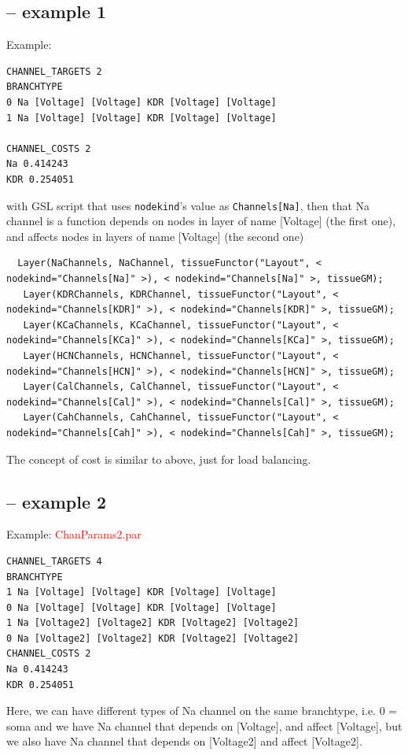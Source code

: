 \subsection{-- example 1}
Example:
\begin{verbatim}
CHANNEL_TARGETS 2
BRANCHTYPE
0 Na [Voltage] [Voltage] KDR [Voltage] [Voltage]
1 Na [Voltage] [Voltage] KDR [Voltage] [Voltage]

CHANNEL_COSTS 2
Na 0.414243
KDR 0.254051
\end{verbatim}
with GSL script that uses \verb!nodekind!'s value as \verb!Channels[Na]!, then
that Na channel is a function depends on nodes in layer of name [Voltage] (the
first one), and affects nodes in layers of name [Voltage] (the second one)
\begin{verbatim}
  Layer(NaChannels, NaChannel, tissueFunctor("Layout", < nodekind="Channels[Na]" >), < nodekind="Channels[Na]" >, tissueGM);
   Layer(KDRChannels, KDRChannel, tissueFunctor("Layout", < nodekind="Channels[KDR]" >), < nodekind="Channels[KDR]" >, tissueGM);
   Layer(KCaChannels, KCaChannel, tissueFunctor("Layout", < nodekind="Channels[KCa]" >), < nodekind="Channels[KCa]" >, tissueGM);
   Layer(HCNChannels, HCNChannel, tissueFunctor("Layout", < nodekind="Channels[HCN]" >), < nodekind="Channels[HCN]" >, tissueGM);
   Layer(CalChannels, CalChannel, tissueFunctor("Layout", < nodekind="Channels[Cal]" >), < nodekind="Channels[Cal]" >, tissueGM);
   Layer(CahChannels, CahChannel, tissueFunctor("Layout", < nodekind="Channels[Cah]" >), < nodekind="Channels[Cah]" >, tissueGM);
\end{verbatim}

The concept of cost is similar to above, just for load balancing.

\subsection{-- example 2}

Example: \textcolor{red}{ChanParams2.par}
\begin{verbatim}
CHANNEL_TARGETS 4
BRANCHTYPE
1 Na [Voltage] [Voltage] KDR [Voltage] [Voltage]
0 Na [Voltage] [Voltage] KDR [Voltage] [Voltage]
1 Na [Voltage2] [Voltage2] KDR [Voltage2] [Voltage2]
0 Na [Voltage2] [Voltage2] KDR [Voltage2] [Voltage2]
CHANNEL_COSTS 2
Na 0.414243
KDR 0.254051
\end{verbatim}
Here, we can have different types of Na channel on the same branchtype, i.e. 0 =
soma and we have Na channel that depends on [Voltage], and affect [Voltage], but
we also have Na channel that depends on [Voltage2] and affect [Voltage2].

